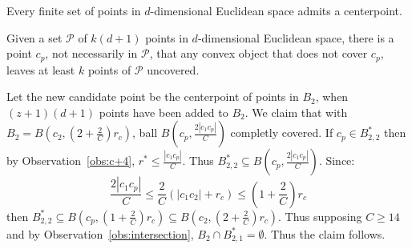 \documentclass[envcountsame]{cls/cccg15}
\newcommand{\card}[1]{\left|{#1}\right|}
\newcommand{\lee}{\leqslant}
\newcommand{\gee}{\geqslant}
\renewcommand{\leq}{\lee}
\renewcommand{\le}{\lee}
\renewcommand{\ge}{\gee}
\begin{document}
\begin{prop}
Every finite set of points in $d$\nobreakdash-dimensional Euclidean space admits a centerpoint.\cite{edelsbrunner1987algorithms}
\end{prop}

\begin{cor}
\label{cor:omitting-centerpoint}
Given a set $\mathcal{P}$ of $k(d+1)$ points in $d$\nobreakdash-dimensional Euclidean space, there is a point $c_p$, not necessarily in $\mathcal{P}$, that any convex object that does not cover $c_p$, leaves at least $k$ points of $\mathcal{P}$ uncovered.
\end{cor}

Let the new candidate point be the centerpoint of points in $B_2$, when $(z+1)(d+1)$ points have been added to $B_2$. We claim that with $B_2 = B(c_2, (2 + \frac{2}{C})r_c)$, ball $B(c_p, \frac{2\card{c_1c_p}}{C})$ completly covered.
If $c_p \in B_{2,2}^*$ then by Observation~\ref{obs:c+4}, $r^* \le \frac{\card{c_1c_p}}{C}$. Thus $B_{2,2}^* \subseteq B(c_p, \frac{2\card{c_1c_p}}{C})$.
Since:
\[
\frac{2\card{c_1c_p}}{C} \leq \frac{2}{C}(\card{c_1c_2} + r_c) \leq (1 + \frac{2}{C})r_c
\]
 then $B_{2,2}^* \subseteq B(c_p, (1 + \frac{2}{C})r_c) \subseteq B(c_2, (2 + \frac{2}{C})r_c)$. Thus supposing $C \ge 14$ and by Observation~\ref{obs:intersection}, $B_2 \cap B_{2,1}^* = \emptyset$. Thus the claim follows.
\end{document}
